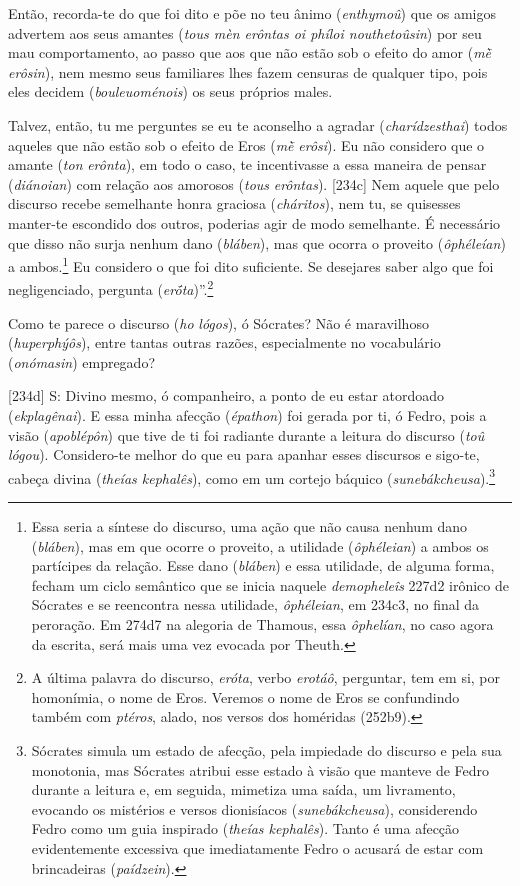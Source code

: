 Então, recorda-te do que foi dito e põe no teu ânimo (\emph{enthymoû})
que os amigos advertem aos seus amantes (\emph{tous mèn erôntas oi
phíloi nouthetoûsin}) por seu mau comportamento, ao passo que aos que
não estão sob o efeito do amor (\emph{mḕ} \emph{erôsin}), nem mesmo seus
familiares lhes fazem censuras de qualquer tipo, pois eles decidem
(\emph{bouleuoménois}) os seus próprios males.

Talvez, então, tu me perguntes se eu te aconselho a agradar
(\emph{charídzesthai}) todos aqueles que não estão sob o efeito de Eros
(\emph{mḕ} \emph{erôsi}). Eu não considero que o amante (\emph{ton}
\emph{erônta}), em todo o caso, te incentivasse a essa maneira de pensar
(\emph{diánoian}) com relação aos amorosos (\emph{tous} \emph{erôntas}).
{[}234c{]} Nem aquele que pelo discurso recebe semelhante honra graciosa
(\emph{cháritos}), nem tu, se quisesses manter-te escondido dos outros,
poderias agir de modo semelhante. É necessário que disso não surja
nenhum dano (\emph{bláben}), mas que ocorra o proveito
(\emph{ôphéleían}) a ambos.\footnote{Essa seria a síntese do discurso,
  uma ação que não causa nenhum dano (\emph{bláben}), mas em que ocorre
  o proveito, a utilidade (\emph{ôphéleian}) a ambos os partícipes da
  relação. Esse dano (\emph{bláben}) e essa utilidade, de alguma forma,
  fecham um ciclo semântico que se inicia naquele \emph{demopheleîs}
  227d2 irônico de Sócrates e se reencontra nessa utilidade,
  \emph{ôphéleian}, em 234c3, no final da peroração. Em 274d7 na
  alegoria de Thamous, essa \emph{ôphelían}, no caso agora da escrita,
  será mais uma vez evocada por Theuth.} Eu considero o que foi dito
suficiente. Se desejares saber algo que foi negligenciado, pergunta
(\emph{erṓta})''.\footnote{A última palavra do discurso, \emph{eróta},
  verbo \emph{erotáô}, perguntar, tem em si, por homonímia, o nome de
  Eros. Veremos o nome de Eros se confundindo também com
  \emph{pt\emph{éros}}, alado, nos versos dos homéridas (252b9).}

Como te parece o discurso (\emph{ho} \emph{lógos}), ó Sócrates? Não é
maravilhoso (\emph{huperphýôs}), entre tantas outras razões,
especialmente no vocabulário (\emph{onómasin}) empregado?

{[}234d{]} S: Divino mesmo, ó companheiro, a ponto de eu estar atordoado
(\emph{ekplagênai}). E essa minha afecção (\emph{épathon}) foi gerada
por ti, ó Fedro, pois a visão (\emph{apoblépôn}) que tive de ti foi
radiante durante a leitura do discurso (\emph{toû} \emph{lógou}).
Considero-te melhor do que eu para apanhar esses discursos e sigo-te,
cabeça divina (\emph{theías kephalês}), como em um cortejo báquico
(\emph{sunebákcheusa}).\footnote{Sócrates simula um estado de afecção,
  pela impiedade do discurso e pela sua monotonia, mas Sócrates atribui
  esse estado à visão que manteve de Fedro durante a leitura e, em
  seguida, mimetiza uma saída, um livramento, evocando os mistérios e
  versos dionisíacos (\emph{sunebákcheusa}), considerendo Fedro como um
  guia inspirado (\emph{theías kephalês}). Tanto é uma afecção
  evidentemente excessiva que imediatamente Fedro o acusará de estar com
  brincadeiras (\emph{paídzein}).}

